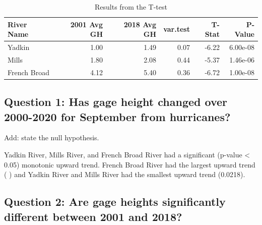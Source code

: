 \documentclass[
  12pt,
]{article}
\begin{document}
\begin{table}

\caption{\label{tab:ResultsTable}Results from the T-test}
\centering
\begin{tabular}[t]{|>{}l|||>{}r|||>{}r|||>{}r|||>{}r||r}
\hline
River Name & 2001 Avg GH & 2018 Avg GH & var.test & T-Stat & P-Value\\
\hline
Yadkin & 1.00 & 1.49 & 0.07 & -6.22 & 6.00e-08\\
\hline
Mills & 1.80 & 2.08 & 0.44 & -5.37 & 1.46e-06\\
\hline
French Broad & 4.12 & 5.40 & 0.36 & -6.72 & 1.00e-08\\
\hline
\end{tabular}
\end{table}

\hypertarget{question-1-has-gage-height-changed-over-2000-2020-for-september-from-hurricanes}{%
\subsection{Question 1: Has gage height changed over 2000-2020 for
September from
hurricanes?}\label{question-1-has-gage-height-changed-over-2000-2020-for-september-from-hurricanes}}

Add: state the null hypothesis.

Yadkin River, Mills River, and French Broad River had a significant
(p-value \textless{} 0.05) monotonic upward trend. French Broad River
had the largest upward trend ( ) and Yadkin River and Mills River had
the smallest upward trend (0.0218).

\hypertarget{question-2-are-gage-heights-significantly-different-between-2001-and-2018}{%
\subsection{Question 2: Are gage heights significantly different between
2001 and
2018?}\label{question-2-are-gage-heights-significantly-different-between-2001-and-2018}}
\end{document}
